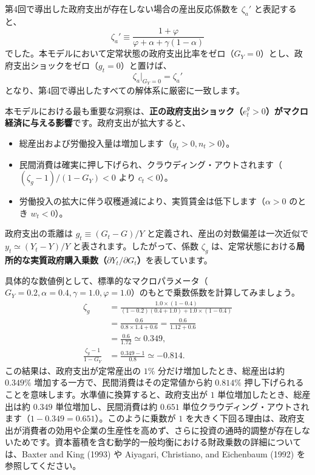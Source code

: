 \documentclass[
  japanese,
  lualatex,
  ja=standard,
  12pt,
  a4paper]{ltjsarticle}
\providecommand{\tightlist}{%
  \setlength{\itemsep}{0pt}\setlength{\parskip}{0pt}}
\begin{document}
第4回で導出した政府支出が存在しない場合の産出反応係数を \(\zeta_a'\)
と表記すると、 \[
\zeta_a' \equiv \frac{1+\varphi}{\varphi + \alpha + \gamma(1-\alpha)}
\]
でした。本モデルにおいて定常状態の政府支出比率をゼロ（\(G_Y = 0\)）とし、政府支出ショックをゼロ（\(g_t = 0\)）と置けば、
\[
\zeta_a \Big|_{G_Y=0} = \zeta_a'
\] となり、第4回で導出したすべての解体系に厳密に一致します。

本モデルにおける最も重要な洞察は、\textbf{正の政府支出ショック（\(e_t^g > 0\)）がマクロ経済に与える影響}です。政府支出が拡大すると、

\begin{itemize}
\tightlist
\item
  総産出および労働投入量は増加します（\(y_t > 0, n_t > 0\)）。
\item
  民間消費は確実に押し下げられ、クラウディング・アウトされます（\((\zeta_g - 1)/(1-G_Y) < 0\)
  より \(c_t < 0\)）。
\item
  労働投入の拡大に伴う収穫逓減により、実質賃金は低下します（\(\alpha > 0\)
  のとき \(w_t < 0\)）。
\end{itemize}

政府支出の乖離は \(g_t \equiv (G_t - G)/Y\)
と定義され、産出の対数偏差は一次近似で \(y_t \simeq (Y_t - Y)/Y\)
と表されます。したがって、係数 \(\zeta_g\)
は、定常状態における\textbf{局所的な実質政府購入乗数（\(\partial Y_t / \partial G_t\)）}を表しています。

\Needspace{0.30\textheight}

具体的な数値例として、標準的なマクロパラメータ（\(G_Y = 0.2, \alpha = 0.4, \gamma = 1.0, \varphi = 1.0\)）のもとで乗数係数を計算してみましょう。
\[
\begin{aligned}
\zeta_g &= \frac{1.0 \times (1 - 0.4)}{(1 - 0.2)(0.4 + 1.0) + 1.0 \times (1 - 0.4)}\\[6pt]
&= \frac{0.6}{0.8 \times 1.4 + 0.6}
 = \frac{0.6}{1.12 + 0.6}\\[6pt]
&= \frac{0.6}{1.72} \simeq 0.349,\\[8pt]
\frac{\zeta_g - 1}{1-G_Y} &= \frac{0.349 - 1}{0.8} \simeq -0.814.
\end{aligned}
\] この結果は、政府支出が定常産出の \(1\%\)
分だけ増加したとき、総産出は約 \(0.349\%\)
増加する一方で、民間消費はその定常値から約 \(0.814\%\)
押し下げられることを意味します。水準値に換算すると、政府支出が \(1\)
単位増加したとき、総産出は約 \(0.349\) 単位増加し、民間消費は約
\(0.651\)
単位クラウディング・アウトされます（\(1 - 0.349 = 0.651\)）。このように乗数が
\(1\)
を大きく下回る理由は、政府支出が消費者の効用や企業の生産性を高めず、さらに投資の通時的調整が存在しないためです。資本蓄積を含む動学的一般均衡における財政乗数の詳細については、Baxter
and King (1993) や Aiyagari, Christiano, and Eichenbaum (1992)
を参照してください。
\end{document}
